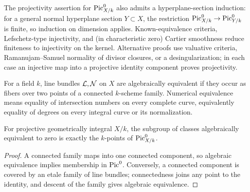 \begin{remark}\label{kps-rmk-alt-projectivity}
The projectivity assertion for $\operatorname{Pic}^0_{X/k}$ also admits a hyperplane-section
induction: for a general normal hyperplane section $Y\subset X$, the
restriction $\operatorname{Pic}^0_{X/k}\to\operatorname{Pic}^0_{Y/k}$ is finite, so induction on dimension
applies. Known-equivalence criteria, Lefschetz-type injectivity, and (in
characteristic zero) Cartier smoothness reduce finiteness to injectivity on
the kernel. Alternative proofs use valuative criteria, Ramanujam--Samuel
normality of divisor closures, or a desingularization; in each case an
injective map into a projective identity component proves projectivity.
\end{remark}

\begin{definition}\label{kps-def-algebraic-equivalence}
For a field $k$, line bundles $\mathcal L,\mathcal N$ on $X$ are algebraically equivalent if
they occur as fibers over two points of a connected $k$-scheme family. Numerical
equivalence means equality of intersection numbers on every complete curve,
equivalently equality of degrees on every integral curve or its normalization.
\end{definition}

\begin{proposition}\label{kps-prop-algebraic-equivalence}
For projective geometrically integral $X/k$, the subgroup of classes algebraically
equivalent to zero is exactly the $k$-points of $\operatorname{Pic}^0_{X/k}$.
\end{proposition}
\begin{proof}
A connected family maps into one connected component, so algebraic equivalence
implies membership in $\operatorname{Pic}^0$. Conversely, a connected component is covered by
an etale family of line bundles; connectedness joins any point to the identity,
and descent of the family gives algebraic equivalence.
\end{proof}

